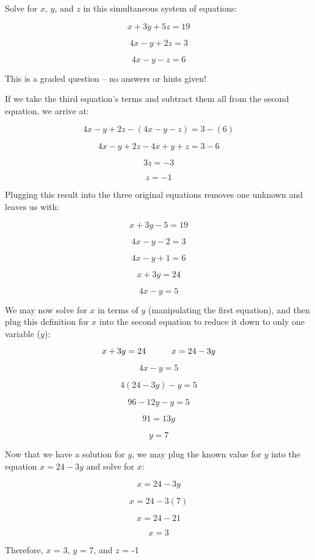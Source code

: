 

Solve for $x$, $y$, and $z$ in this simultaneous system of equations:

$$x + 3y + 5z = 19$$

$$4x - y + 2z = 3$$

$$4x - y - z = 6$$

\vfil 

\eject






This is a graded question -- no answers or hints given!







If we take the third equation's terms and subtract them all from the second equation, we arrive at:

$$4x - y + 2z - (4x - y - z) = 3 - (6)$$

$$4x - y + 2z - 4x + y + z = 3 - 6$$

$$3z = -3$$

$$z = -1$$

Plugging this result into the three original equations removes one unknown and leaves us with:

$$x + 3y - 5 = 19$$

$$4x - y - 2 = 3$$

$$4x - y + 1 = 6$$

\vskip 10pt

$$x + 3y = 24$$

$$4x - y = 5$$

\vskip 10pt

We may now solve for $x$ in terms of $y$ (manipulating the first equation), and then plug this definition for $x$ into the second equation to reduce it down to only one variable ($y$):

$$x + 3y = 24 \hskip 30pt x = 24 - 3y$$

$$4x - y = 5$$

$$4(24 - 3y) - y = 5$$

$$96 - 12y - y = 5$$

$$91 = 13y$$

$$y = 7$$

\filbreak

Now that we have a solution for $y$, we may plug the known value for $y$ into the equation $x = 24 - 3y$ and solve for $x$:

$$x = 24 - 3y$$

$$x = 24 - 3(7)$$

$$x = 24 - 21$$

$$x = 3$$

\vskip 10pt

Therefore, $x$ = 3, $y$ = 7, and $z$ = -1




